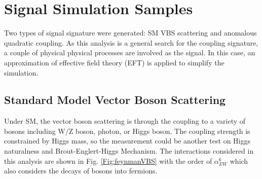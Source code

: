 \section{Signal Simulation Samples}
Two types of signal signature were generated: SM VBS scattering and anomalous quadratic coupling. As this analysis is a general search for the coupling signature, a couple of physical physical processes are involved as the signal. In this case, an approximation of effective field theory (EFT) is applied to simplify the simulation. 

\subsection{Standard Model Vector Boson Scattering}
Under SM, the vector boson scattering is through the coupling to a variety of bosons including W/Z boson, photon, or Higgs boson. The coupling strength is constrained by Higgs mass, so the measurement could be another test on Higgs naturalness and  Brout-Englert-Higgs Mechanism\cite{PhysRevD.7.3111}. The interactions considered in this analysis are shown in Fig. \ref{Fig:feynmanVBS}  with the order of $\alpha_{EW}^6$ which also considers the decays of bosons into fermions. 

